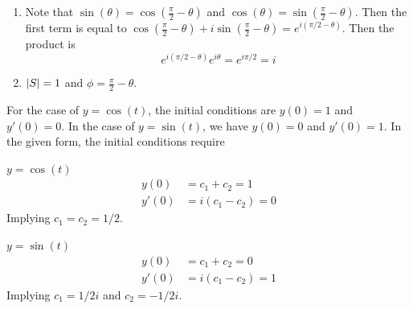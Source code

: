 \documentclass[a4paper]{article}
\begin{document}
\begin{enumerate}[label=(\alph*)]
	\item Note that \(\sin\left( \theta  \right) = \displaystyle{\cos\left( \frac{\pi }{2} - \theta  \right)}\) and \(\cos\left( \theta  \right) = \displaystyle{\sin\left( \frac{\pi }{2} - \theta  \right)}\). Then the first term is equal to \(\displaystyle{\cos\left( \frac{\pi }{2} - \theta  \right) + i \sin\left( \frac{\pi }{2} - \theta  \right) = e^{i \!\left( \pi / 2 - \theta  \right) }}\). Then the product is
	\[
		e^{i \!\left( \pi / 2 - \theta  \right) } e^{i \theta } = e^{i \pi / 2} = i
	\]
	\item \(\lvert S\rvert = 1\) and \(\displaystyle{\phi = \frac{\pi }{2} - \theta }\).
\end{enumerate}



For the case of \(y = \cos\left( t \right)\), the initial conditions are \(y \!\left( 0 \right) = 1\) and \(y'\!\left( 0 \right) = 0\). In the case of \(y  = \sin\left( t \right)\), we have \(y \!\left( 0 \right) = 0\) and \(y'\!\left( 0 \right) = 1\). In the given form, the initial conditions require

\underline{\(y = \cos\left( t \right)\)}
\begin{align*}
	y \!\left( 0 \right) & = c_{1} + c_{2} = 1 \\
	y' \!\left( 0 \right) & = i \!\left( c_{1} - c_{2} \right) = 0
\end{align*}
Implying \(c_{1} = c_{2} = 1/2\).

\underline{\( y = \sin\left( t \right) \)}
\begin{align*}
	y \!\left( 0 \right)  & = c_{1} + c_{2} = 0 \\
	y'\!\left( 0 \right)  & = i \!\left( c_{1} - c_{2} \right) = 1  
\end{align*}
Implying \(c_{1} = 1 / 2i\) and \(c_{2} = -1 / 2i\).
\end{document}
